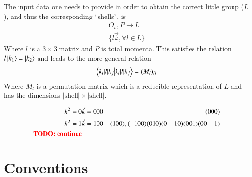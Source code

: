The input data one needs to provide in order to obtain the correct little group ($L$), and thus the corresponding ``shells'', is 
\begin{align}
    O_h,P \rightarrow L \\
    \{l\vec{k}, \forall l \in L\}
\end{align}
Where $l$ is a $3\times3$ matrix and $P$ is total momenta. This satisfies the relation $l\ket{k_1} = \ket{k_2}$ and leads to the more general relation 
\begin{align}
    \braket{k_i|l|k_j} = (M_l)_{ij}
\end{align} 
Where $M_l$ is a permutation matrix which is a reducible representation of $L$ and has the dimensions $|\text{shell}| \times |\text{shell}|$. 

\begin{align}
    k^2 = 0 & \vec{k} = 000 & {(000)} \\
    k^2 = 1 & \vec{k}=100 & {(100),(-100)(010)(0-10)(001)(00-1)} \\
    \textbf{\color{red}TODO: continue}
\end{align}


\section{Conventions}

